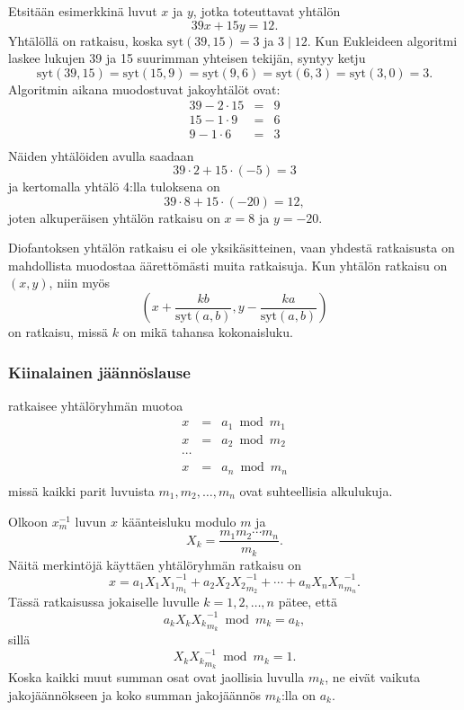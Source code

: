 Etsitään esimerkkinä luvut $x$ ja $y$,
jotka toteuttavat yhtälön
\[
39x + 15y = 12.
\]
Yhtälöllä on ratkaisu, koska $\textrm{syt}(39,15)=3$
ja $3 \mid 12$.
Kun Eukleideen algoritmi laskee lukujen
39 ja 15 suurimman
yhteisen tekijän, syntyy ketju
\[
\textrm{syt}(39,15) = \textrm{syt}(15,9)
= \textrm{syt}(9,6) = \textrm{syt}(6,3)
= \textrm{syt}(3,0) = 3. \]
Algoritmin aikana muodostuvat jakoyhtälöt ovat:
\[
\begin{array}{lcl}
39 - 2 \cdot 15 & = & 9 \\
15 - 1 \cdot 9 & = & 6 \\
9 - 1 \cdot 6 & = & 3 \\
\end{array}
\]
Näiden yhtälöiden avulla saadaan
\[
39 \cdot 2 + 15 \cdot (-5) = 3
\]
ja kertomalla yhtälö 4:lla tuloksena on
\[
39 \cdot 8 + 15 \cdot (-20) = 12,
\]
joten alkuperäisen yhtälön ratkaisu on $x=8$ ja $y=-20$.

Diofantoksen yhtälön ratkaisu ei ole yksikäsitteinen,
vaan yhdestä ratkaisusta on mahdollista muodostaa
äärettömästi muita ratkaisuja.
Kun yhtälön ratkaisu on $(x,y)$,
niin myös
\[(x+\frac{kb}{\textrm{syt}(a,b)},y-\frac{ka}{\textrm{syt}(a,b)})\]
on ratkaisu, missä $k$ on mikä tahansa kokonaisluku.

\subsubsection{Kiinalainen jäännöslause}


 ratkaisee yhtälöryhmän muotoa
\[
\begin{array}{lcl}
x & = & a_1 \bmod m_1 \\
x & = & a_2 \bmod m_2 \\
\cdots \\
x & = & a_n \bmod m_n \\
\end{array}
\]
missä kaikki parit luvuista $m_1,m_2,\ldots,m_n$
ovat suhteellisia alkulukuja.

Olkoon $x^{-1}_m$ luvun $x$ käänteisluku
modulo $m$ ja
\[ X_k = \frac{m_1 m_2 \cdots m_n}{m_k}.\]
Näitä merkintöjä käyttäen yhtälöryhmän ratkaisu on
\[x = a_1 X_1 {X_1}^{-1}_{m_1} + a_2 X_2 {X_2}^{-1}_{m_2} + \cdots + a_n X_n {X_n}^{-1}_{m_n}.\]
Tässä ratkaisussa jokaiselle luvulle $k=1,2,\ldots,n$
pätee, että
\[a_k X_k {X_k}^{-1}_{m_k} \bmod m_k = a_k,\]
sillä
\[X_k {X_k}^{-1}_{m_k} \bmod m_k = 1.\]
Koska kaikki muut summan osat ovat jaollisia luvulla
$m_k$, ne eivät vaikuta jakojäännökseen ja
koko summan jakojäännös $m_k$:lla on $a_k$.

